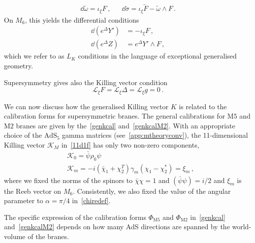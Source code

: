 \documentclass[debug]{phd}
\begin{document}
%
	\begin{align} \label{isom5}
		& &\dd  \tilde{\omega} = \iota_{\xi} F\, , & & \dd  \tilde{\sigma} = \iota_{\xi} \tilde{F} - \tilde{\omega} \wedge F\, . & &
	\end{align}
%
On $M_6$, this yields the differential conditions
%
	\begin{subequations}
	\label{eq:m-theory_structure_eqs}
		\begin{align}
			\dd  \left( e^{\Delta} Y'\right) &= - \iota_{\xi} F\, , \\[1mm]
			\dd  \left( e^{\Delta}Z\right) &= e^{\Delta} Y' \wedge F\, ,
		\end{align}
	\end{subequations}
%
which we refer to as $L_K$ conditions in the language of exceptional generalised geometry.
%

Supersymmetry gives also the Killing vector condition
%
	\begin{equation}
		\mathcal{L}_\xi F = \mathcal{L}_\xi \Delta = \mathcal{L}_\xi g = 0\, . 
	\end{equation}
% 
%

We can now discuss how the generalised Killing vector $K$ is related to the calibration forms for supersymmetric branes.
The general calibrations for $\mathrm{M}5$ and $\mathrm{M}2$ branes are given by the~\eqref{genkcal} and~\eqref{genkcalM2}. 
With an appropriate choice of the $\mathrm{AdS}_5$ gamma matrices (see~\cref{app:mtheoryconv}), the 11-dimensional Killing vector $\mathcal{K}_M$ in~\eqref{11d1f} has only two non-zero components,
\begin{subequations}
\begin{align}
& \mathcal{K}_0 = \bar{\psi} \rho_0 \psi \\
& \mathcal{K}_m = -i \left(\bar{\chi}_1+\chi_2^T\right)\gamma_{m}\left(\chi_1 - \chi_2^* \right) = \xi_m \, ,
\end{align}
\end{subequations}
where we fixed the norms of the spinors to $\bar \chi \chi = 1$ and $(\bar{\psi}\psi) = i/2$ and $\xi_m$ is the Reeb vector on $M_6$. Consistently, we also fixed the value of the angular parameter to $\alpha  = \pi/4$ in~\eqref{chiredef}.

The specific expression of the calibration forms $\Phi_{\mathrm{M}5}$ and $\Phi_{\mathrm{M}2}$ in~\eqref{genkcal} and~\eqref{genkcalM2} depends on how many AdS directions are spanned by the world-volume of the branes. 
\end{document}
